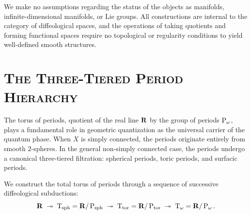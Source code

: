 \documentclass[11pt,reqno,letterpaper,twoside]{amsart}
\begin{document}
  We make no assumptions regarding the status of the objects as manifolds,
  infinite-dimensional manifolds,
  or Lie groups.
  All constructions are internal to the category of diffeological spaces,
  and the operations of taking quotients and forming functional spaces require no topological or regularity conditions to yield well-defined smooth structures.
  
  
  \section{\textsc{\textbf{The Three-Tiered Period Hierarchy}}}
  \label{sec:GroupAndTorusOfPeriods}
  
  The torus of periods,
  quotient of the real line ${\mathbf{R}}$ by the group of periods $\operatorname{P}_\omega$,
  plays a fundamental role in geometric quantization as the universal carrier of the quantum phase.
  When $X$ is simply connected,
  the periods originate entirely from smooth $2$-spheres.
  In the general non-simply connected case,
  the periods undergo a canonical three-tiered filtration:
  spherical periods,
  toric periods,
  and surfacic periods.
  
  We construct the total torus of periods through a sequence of successive diffeological subductions:
  \[%
    \fieldR \;\twoheadrightarrow\; \Torus_\sph = \fieldR/\Periods_\sph \;\twoheadrightarrow\; \Torus_\tor = \fieldR/\Periods_\tor \;\twoheadrightarrow\; \Torus_\omega = \fieldR/\Periods_\omega.
    \]%
  
\end{document}
